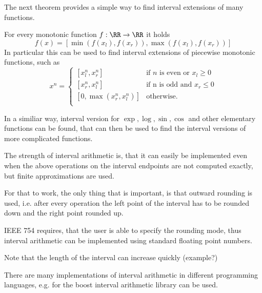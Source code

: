	The next theorem provides a simple way to find interval extensions of many functions.
	\begin{theorem}
		For every monotonic function $f: \RR \to \RR$ it holds
		$$ f(x) = [\min(f(x_l), f(x_r)), \max(f(x_l), f(x_r))] $$
		In particular this can be used to find interval extensions of piecewise monotonic functions, such as
		\begin{equation}
			x^n  =   
				\begin{cases} 
					[x_l^n, x_r^n] &\mbox{if } n \mbox{ is even or } x_l \geq 0 \\
					[x_r^n, x_l^n] &\mbox{if n is odd and } x_r \leq 0 \\
					[0, \max(x_r^n, x_l^n)] & \mbox{otherwise.}  \\
				\end{cases} 
		\end{equation} 
	\end{theorem}
	In a similiar way, interval version for $\exp, \log, \sin, \cos$ and other elementary functions can be found, 
	that can then be used to find the interval versions of more complicated functions.



	The strength of interval arithmetic is, that it can easily be implemented even when the above 
	operations on the interval endpoints are not computed exactly, but finite approximations are used.
	
	For that to work, the only thing that is important, is that outward rounding is used, i.e. 
	after every operation the left point of the interval has to be rounded down and the right point rounded up.

	IEEE 754 requires, that the user is able to specify the rounding mode, thus interval arithmetic can be implemented 
	using standard floating point numbers.

	Note that the length of the interval can increase quickly  (example?)

	There are many implementations of interval arithmetic in different programming languages, e.g. 
	for \cc the boost interval arithmetic library can be used.

